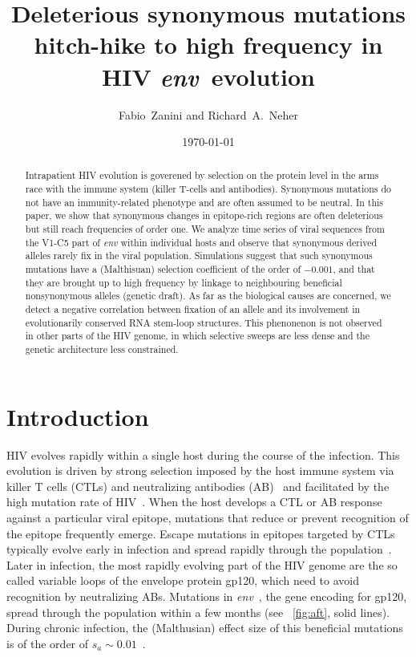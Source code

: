 \documentclass[rmp, twocolumn]{revtex4}
\newcommand{\Author}{Fabio~Zanini and Richard~A.~Neher}
\newcommand{\Title}{Deleterious synonymous mutations hitch-hike to high frequency in HIV \env~evolution}
\newcommand{\env}{\textit{env}}
\begin{document}
\title{\Title}
\author{\Author}
\date{\today}

\begin{abstract}
\noindent
Intrapatient HIV evolution is goverened by selection on the protein level in the
arms race with the immune system (killer T-cells and antibodies). Synonymous
mutations do not have an immunity-related phenotype and are often assumed to be
neutral. In this paper, we show that synonymous changes in epitope-rich regions
are often deleterious but still reach frequencies of order one.  We analyze time
series of viral sequences from the V1-C5 part of {\it env} within individual
hosts and observe that synonymous derived alleles rarely fix in the
viral population. Simulations suggest that such synonymous mutations
have a (Malthisuan) selection coefficient of the order of $-0.001$, and that
they are brought up to high frequency by linkage to neighbouring beneficial
nonsynonymous alleles (genetic draft). As far as the biological causes are
concerned, we detect a negative correlation between fixation of an allele and
its involvement in evolutionarily conserved RNA stem-loop structures.
This phenonenon is not observed in other parts of the HIV genome, in which
selective sweeps are less dense and the genetic architecture less constrained.
\end{abstract}


\maketitle

\section{Introduction}

HIV evolves rapidly within a single host during the course of the infection.
This evolution is driven by strong selection imposed by the host immune system
via killer T cells (CTLs) and neutralizing antibodies
(AB)~\citep{pantaleo_immunopathogenesis_1996} and facilitated by the high
mutation rate of HIV~\citep{mansky_lower_1995}. When the host develops a CTL or
AB response against a particular viral epitope, mutations that reduce or prevent
recognition of the epitope frequently emerge. Escape mutations in epitopes
targeted by CTLs typically evolve early in infection and spread rapidly through
the population~\citep{mcmichael_immune_2009}. Later in infection, the most
rapidly evolving part of the HIV genome are the so called variable loops of the
envelope protein gp120, which need to avoid recognition by neutralizing ABs.
Mutations in \env~, the gene encoding for gp120, spread through the population
within a few months (see \figurename~\ref{fig:aft}, solid lines). During chronic
infection, the (Malthusian) effect size of this beneficial mutations is of the
order of $s_a \sim 0.01$~\citep{neher_recombination_2010}.
\end{document}
